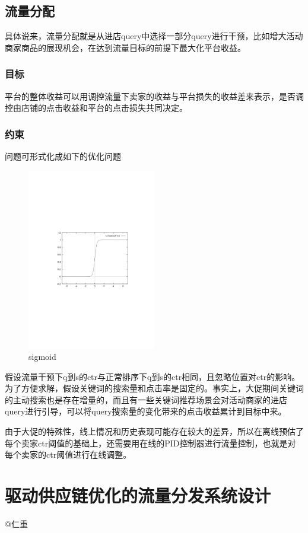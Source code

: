 \subsection{流量分配}
具体说来，流量分配就是从进店query中选择一部分query进行干预，比如增大活动商家商品的展现机会，在达到流量目标的前提下最大化平台收益。
\subsubsection{目标}
平台的整体收益可以用调控流量下卖家的收益与平台损失的收益差来表示，是否调控由店铺的点击收益和平台的点击损失共同决定。
\subsubsection{约束}
问题可形式化成如下的优化问题
\begin{figure}[htbp]
  \centering
  \includegraphics[width=0.5\textwidth]{book/pic/chap8/cp8p1.pdf}
  \caption{sigmoid}\label{fig:digit}
\end{figure}
假设流量干预下q到s的ctr与正常排序下q到s的ctr相同，且忽略位置对ctr的影响。
为了方便求解，假设关键词的搜索量和点击率是固定的。事实上，大促期间关键词的主动搜索也是存在增量的，而且有一些关键词推荐场景会对活动商家的进店query进行引导，可以将query搜索量的变化带来的点击收益累计到目标中来。

由于大促的特殊性，线上情况和历史表现可能存在较大的差异，所以在离线预估了每个卖家ctr阈值的基础上，还需要用在线的PID控制器进行流量控制，也就是对每个卖家的ctr阈值进行在线调整。



\section{驱动供应链优化的流量分发系统设计} 
@仁重

